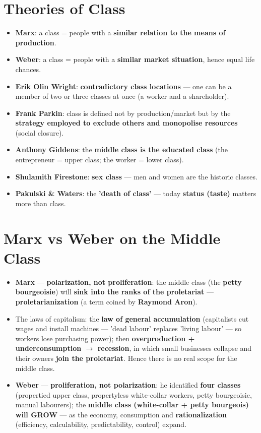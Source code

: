 \section{Theories of Class}

\begin{KeyConcept}
\begin{itemize}
\item \textbf{Marx}: a class = people with a \textbf{similar relation to the means of production}.
\item \textbf{Weber}: a class = people with a \textbf{similar market situation}, hence equal life chances.
\item \textbf{Erik Olin Wright}: \textbf{contradictory class locations} --- one can be a member of two or three classes at once (a worker and a shareholder).
\item \textbf{Frank Parkin}: class is defined not by production/market but by the \textbf{strategy employed to exclude others and monopolise resources} (social closure).
\item \textbf{Anthony Giddens}: the \textbf{middle class is the educated class} (the entrepreneur = upper class; the worker = lower class).
\item \textbf{Shulamith Firestone}: \textbf{sex class} --- men and women are the historic classes.
\item \textbf{Pakulski \& Waters}: the \textbf{'death of class'} --- today \textbf{status (taste)} matters more than class.
\end{itemize}
\end{KeyConcept}

\section{Marx vs Weber on the Middle Class}

\begin{KeyConcept}
\begin{itemize}
\item \textbf{Marx} --- \textbf{polarization, not proliferation}: the middle class (the \textbf{petty bourgeoisie}) will \textbf{sink into the ranks of the proletariat} --- \textbf{proletarianization} (a term coined by \textbf{Raymond Aron}).
\item The laws of capitalism: the \textbf{law of general accumulation} (capitalists cut wages and install machines --- 'dead labour' replaces 'living labour' --- so workers lose purchasing power); then \textbf{overproduction + underconsumption $\rightarrow$ recession}, in which small businesses collapse and their owners \textbf{join the proletariat}. Hence there is no real scope for the middle class.
\item \textbf{Weber} --- \textbf{proliferation, not polarization}: he identified \textbf{four classes} (propertied upper class, propertyless white-collar workers, petty bourgeoisie, manual labourers); the \textbf{middle class (white-collar + petty bourgeois) will GROW} --- as the economy, consumption and \textbf{rationalization} (efficiency, calculability, predictability, control) expand.
\end{itemize}
\end{KeyConcept}

